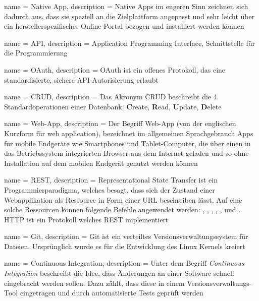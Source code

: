  {
	name = Native App,
	description = {Native Apps im engeren Sinn zeichnen sich dadurch aus, dass sie speziell an die Zielplattform angepasst und sehr leicht über ein herstellerspezifisches Online-Portal bezogen und installiert werden können\cite{mobileapp}}
}

 {
	name = API,
	description = {Application Programming Interface, Schnittstelle für die Programmierung\cite{ba-kort-2012}}
}

 {
	name = OAuth,
	description = {OAuth ist ein offenes Protokoll, das eine standardisierte, sichere API-Autorisierung erlaubt\cite{oauth}}
}

 {
	name = CRUD,
	description = {Das Akronym CRUD beschreibt die 4 Standardoperationen einer Datenbank: \textbf{C}reate, \textbf{R}ead, \textbf{U}pdate, \textbf{D}elete\cite{crud}}
}

 {
	name = Web-App,
	description = {Der Begriff Web-App (von der englischen Kurzform für web application), bezeichnet im allgemeinen Sprachgebrauch Apps für mobile Endgeräte wie Smartphones und Tablet-Computer, die über einen in das Betriebssystem integrierten Browser aus dem Internet geladen und so ohne Installation auf dem mobilen Endgerät genutzt werden können\cite{webapp}}
}

 {
	name = REST,
	description = {Representational State Transfer\cite{rest} ist ein Programmierparadigma, welches besagt, dass sich der Zustand einer Webapplikation als Ressource in Form einer URL beschreiben lässt. Auf eine solche Ressourcen können folgende Befehle angewendet werden: , , , , ,  und .
	HTTP ist ein Protokoll welches REST implementiert\cite{ba-kort-2012}}
}

 {
	name = Git,
	description = {Git ist ein verteiltes Versionsverwaltungssystem für Dateien. Ursprünglich wurde es für die Entwicklung des Linux Kernels kreiert\cite{ba-kort-2012}}
}

 {
	name = Continuous Integration,
	description = {Unter dem Begriff \emph{Continuous Integration}\cite{cont-integration} beschreibt die Idee, dass Änderungen an einer Software schnell eingebracht werden sollen. Dazu zählt, dass diese in einem Versionsverwaltungs-Tool eingetragen und durch automatisierte Tests geprüft werden\cite{ba-kort-2012}}
}


